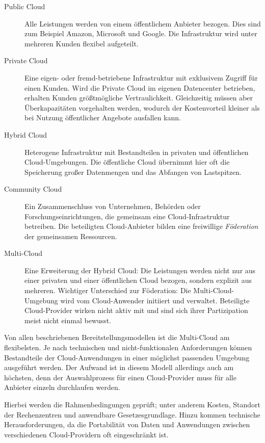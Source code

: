 \begin{description}
	
	\item[Public Cloud] Alle Leistungen werden von einem öffentlichem Anbieter bezogen. Dies sind zum Beispiel Amazon, Microsoft und Google. Die Infrastruktur wird unter mehreren Kunden flexibel aufgeteilt.
	
	\item[Private Cloud] Eine eigen- oder fremd-betriebene Infrastruktur mit exklusivem Zugriff für einen Kunden. Wird die Private Cloud im eigenen Datencenter betrieben, erhalten Kunden größtmögliche Vertraulichkeit. Gleichzeitig müssen aber Überkapazitäten vorgehalten werden, wodurch der Kostenvorteil kleiner als bei Nutzung öffentlicher Angebote ausfallen kann.
	
	\item[Hybrid Cloud] Heterogene Infrastruktur mit Bestandteilen in privaten und öffentlichen Cloud-Umgebungen. Die öffentliche Cloud übernimmt hier oft die Speicherung großer Datenmengen und das Abfangen von Lastspitzen.
	
	\item[Community Cloud] Ein Zusammenschluss von Unternehmen, Behörden oder Forschungseinrichtungen, die gemeinsam eine Cloud-Infrastruktur betreiben. Die beteiligten Cloud-Anbieter bilden eine freiwillige \emph{Föderation} der gemeinsamen Ressourcen.
	
	\item[Multi-Cloud] Eine Erweiterung der Hybrid Cloud: Die Leistungen werden nicht nur aus einer privaten und einer öffentlichen Cloud bezogen, sondern explizit aus mehreren. Wichtiger Unterschied zur Föderation: Die Multi-Cloud-Umgebung wird vom Cloud-Anwender initiiert und verwaltet. Beteiligte Cloud-Provider wirken nicht aktiv mit und sind sich ihrer Partizipation meist nicht einmal bewusst.
	
\end{description}

\noindent
Von allen beschriebenen Bereitstellungsmodellen ist die Multi-Cloud am flexibelsten. Je nach technischen und nicht-funktionalen Anforderungen können Bestandteile der Cloud-Anwendungen in einer möglichst passenden Umgebung ausgeführt werden. Der Aufwand ist in diesem Modell allerdings auch am höchsten, denn der Auswahlprozess für einen Cloud-Provider muss für alle Anbieter einzeln durchlaufen werden.

Hierbei werden die Rahmenbedingungen geprüft; unter anderem Kosten, Standort der Rechenzentren und anwendbare Gesetzesgrundlage. Hinzu kommen technische Herausforderungen, da die Portabilität von Daten und Anwendungen zwischen verschiedenen Cloud-Providern oft eingeschränkt ist.

